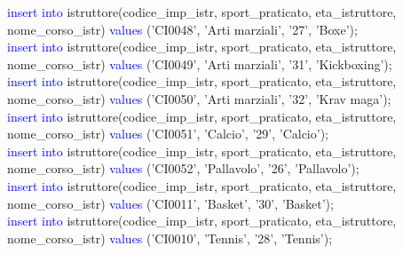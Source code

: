 \documentclass{article}
\begin{document}
\begin{flushleft}
{        \vspace{2mm}
        \hspace*{0.5em}\textcolor{blue}{insert into} istruttore(codice\_imp\_istr, sport\_praticato, eta\_istruttore, \hspace*{0.5em}nome\_corso\_istr) \textcolor{blue}{values} ('CI0048', 'Arti marziali', '27', 'Boxe'); \\
        \vspace{2mm}
        \hspace*{0.5em}\textcolor{blue}{insert into} istruttore(codice\_imp\_istr, sport\_praticato, eta\_istruttore, \hspace*{0.5em}nome\_corso\_istr) \textcolor{blue}{values} ('CI0049', 'Arti marziali', '31', 'Kickboxing'); \\
        \vspace{2mm}
        \hspace*{0.5em}\textcolor{blue}{insert into} istruttore(codice\_imp\_istr, sport\_praticato, eta\_istruttore, \hspace*{0.5em}nome\_corso\_istr) \textcolor{blue}{values} ('CI0050', 'Arti marziali', '32', 'Krav maga'); \\
        \vspace{2mm}
        \hspace*{0.5em}\textcolor{blue}{insert into} istruttore(codice\_imp\_istr, sport\_praticato, eta\_istruttore, \hspace*{0.5em}nome\_corso\_istr) \textcolor{blue}{values} ('CI0051', 'Calcio', '29', 'Calcio'); \\
        \vspace{2mm}
        \hspace*{0.5em}\textcolor{blue}{insert into} istruttore(codice\_imp\_istr, sport\_praticato, eta\_istruttore, \hspace*{0.5em}nome\_corso\_istr) \textcolor{blue}{values} ('CI0052', 'Pallavolo', '26', 'Pallavolo'); \\
        \vspace{2mm}
        \hspace*{0.5em}\textcolor{blue}{insert into} istruttore(codice\_imp\_istr, sport\_praticato, eta\_istruttore, \hspace*{0.5em}nome\_corso\_istr) \textcolor{blue}{values} ('CI0011', 'Basket', '30', 'Basket'); \\
        \vspace{2mm}
        \hspace*{0.5em}\textcolor{blue}{insert into} istruttore(codice\_imp\_istr, sport\_praticato, eta\_istruttore, \hspace*{0.5em}nome\_corso\_istr) \textcolor{blue}{values} ('CI0010', 'Tennis', '28', 'Tennis'); \\
}
\end{flushleft}
\end{document}
